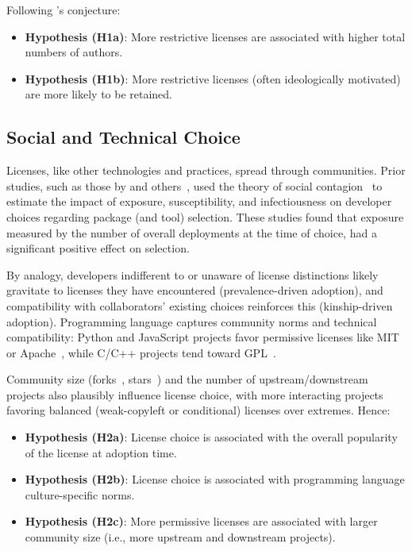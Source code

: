 Following \citet{fershtman2007open}'s conjecture:

\begin{itemize}
    \item \textbf{Hypothesis (H1a)}: More restrictive licenses are associated with higher total numbers of authors.
    \item \textbf{Hypothesis (H1b)}: More restrictive licenses (often ideologically motivated) are more likely to be retained.
\end{itemize}

\subsection{Social and Technical Choice}

Licenses, like other technologies and practices, spread through
communities.
Prior studies, such as those by \citet{ma2020methodology} and 
others~\cite{lamba2020heard, choice23}, used the
theory of social contagion~\cite{shoroye2015exploring} to estimate
the impact of exposure, susceptibility, and infectiousness on
developer choices regarding package (and tool) selection.
These studies found
that exposure measured by the number of overall deployments at the
time of choice, had a significant positive effect on 
selection.

By analogy, developers indifferent to or unaware of license
distinctions likely gravitate to licenses they have encountered
(prevalence-driven adoption), and compatibility with collaborators'
existing choices reinforces this (kinship-driven adoption).
Programming language captures community norms and technical
compatibility: Python and JavaScript projects favor permissive licenses
like MIT or Apache~\cite{lerner2005economics}, while C/C++ projects
tend toward GPL~\cite{fitzgerald2006transformation}.

Community size (forks~\cite{tsay2014influence},
stars~\cite{borges2018s}) and the number of upstream/downstream
projects also plausibly influence license choice, with more interacting
projects favoring balanced (weak-copyleft or conditional) licenses over
extremes. Hence:
\begin{itemize}
    \item \textbf{Hypothesis (H2a)}: License choice is associated with the overall popularity of the license
    at adoption time.
    \item \textbf{Hypothesis (H2b)}: License choice is associated with programming language culture-specific norms.
    \item \textbf{Hypothesis (H2c)}: More permissive licenses are associated with larger community size
    (i.e., more upstream and downstream projects).
\end{itemize}

